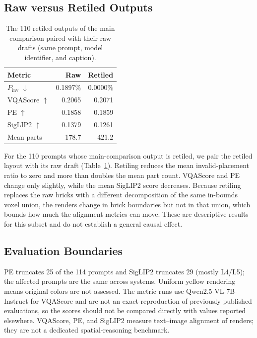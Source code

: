 \documentclass[letterpaper]{article} %
\begin{document}
\subsection{Raw versus Retiled Outputs}
\begin{table}[t]
\centering
\small
\begin{tabular}{lrr}
\toprule
Metric & Raw & Retiled \\
\midrule
$P_{\mathrm{inv}}$ $\downarrow$ & 0.1897\% & 0.0000\% \\
VQAScore $\uparrow$ & 0.2065 & 0.2071 \\
PE $\uparrow$ & 0.1858 & 0.1859 \\
SigLIP2 $\uparrow$ & 0.1379 & 0.1261 \\
Mean parts & 178.7 & 421.2 \\
\bottomrule
\end{tabular}
\caption{The 110 retiled outputs of the main comparison paired with their raw drafts (same prompt, model identifier, and caption).}
\label{tab:raw-retiled}
\end{table}
For the 110 prompts whose main-comparison output is retiled, we pair the retiled layout with its raw draft (Table~\ref{tab:raw-retiled}). Retiling reduces the mean invalid-placement ratio to zero and more than doubles the mean part count. VQAScore and PE change only slightly, while the mean SigLIP2 score decreases. Because retiling replaces the raw bricks with a different decomposition of the same in-bounds voxel union, the renders change in brick boundaries but not in that union, which bounds how much the alignment metrics can move. These are descriptive results for this subset and do not establish a general causal effect.

\subsection{Evaluation Boundaries}
PE truncates 25 of the 114 prompts and SigLIP2 truncates 29 (mostly L4/L5); the affected prompts are the same across systems. Uniform yellow rendering means original colors are not assessed. The metric runs use Qwen2.5-VL-7B-Instruct for VQAScore and are not an exact reproduction of previously published evaluations, so the scores should not be compared directly with values reported elsewhere. VQAScore, PE, and SigLIP2 measure text--image alignment of renders; they are not a dedicated spatial-reasoning benchmark.
\end{document}
